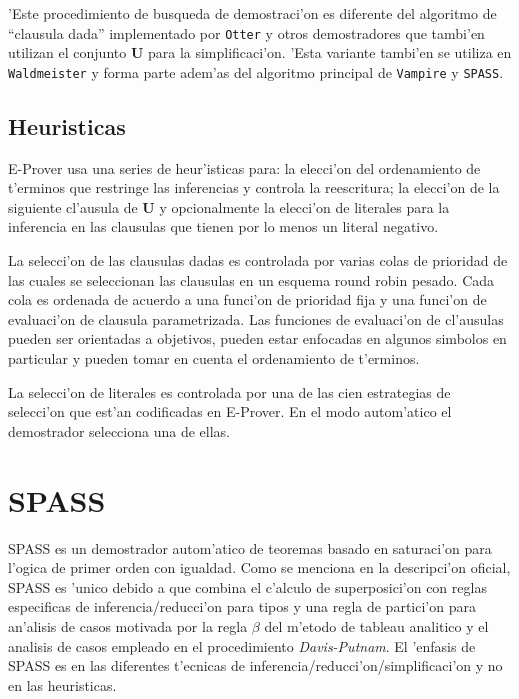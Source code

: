 'Este procedimiento de busqueda de demostraci'on es diferente del algoritmo de ``clausula dada'' implementado por \texttt{Otter} y otros demostradores que tambi'en utilizan el conjunto \textbf{U} para la simplificaci'on. 'Esta variante tambi'en se utiliza en \texttt{Waldmeister} y forma parte adem'as del algoritmo principal de \texttt{Vampire} y \texttt{SPASS}.

\subsection{Heuristicas}

E-Prover usa una series de heur'isticas para: la elecci'on del ordenamiento de t'erminos que restringe las inferencias y controla la reescritura; la elecci'on de la siguiente cl'ausula de \textbf{U} y opcionalmente la elecci'on de literales para la inferencia en las clausulas que tienen por lo menos un literal negativo.

La selecci'on de las clausulas dadas es controlada por varias colas de prioridad de las cuales se seleccionan las clausulas en un esquema round robin pesado. Cada cola es ordenada de acuerdo a una funci'on de prioridad fija y una funci'on de evaluaci'on de clausula parametrizada. Las funciones de evaluaci'on de cl'ausulas pueden ser orientadas a objetivos, pueden estar enfocadas en algunos simbolos en particular y pueden tomar en cuenta el ordenamiento de t'erminos. 


La selecci'on de literales es controlada por una de las cien estrategias de selecci'on que est'an codificadas en E-Prover. En el modo autom'atico el demostrador selecciona una de ellas.




\section{SPASS}

SPASS es un demostrador autom'atico de teoremas basado en saturaci'on para l'ogica de primer orden con igualdad. Como se menciona en la descripci'on oficial, SPASS es 'unico debido a que combina el c'alculo de superposici'on con reglas especificas de inferencia/reducci'on para tipos y una regla de partici'on para an'alisis de casos motivada por la regla $\beta$ del m'etodo de tableau analitico y el analisis de casos empleado en el procedimiento \textit{Davis-Putnam}. El 'enfasis de SPASS es en las diferentes t'ecnicas de inferencia/reducci'on/simplificaci'on y no en las heuristicas.

